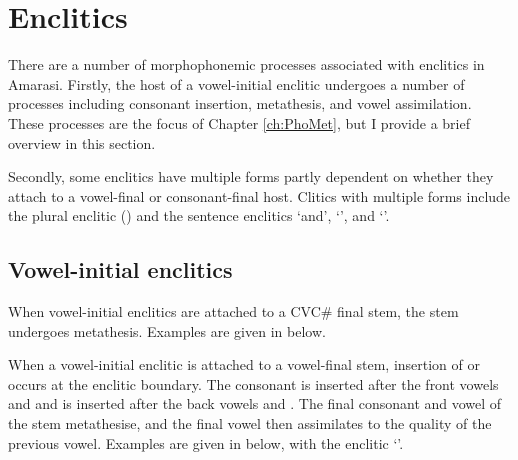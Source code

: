 \section{Enclitics}\label{sec:CliBou}
There are a number of morphophonemic processes
associated with enclitics in Amarasi.
Firstly, the host of a vowel-initial enclitic
undergoes a number of processes including
consonant insertion, metathesis, and vowel assimilation.
These processes are the focus of Chapter \ref{ch:PhoMet},
but I provide a brief overview in this section.

Secondly, some enclitics have multiple forms
partly dependent on whether they attach to a vowel-final
or consonant-final host. Clitics with multiple forms
include the plural enclitic  ()
and the sentence enclitics  `and', 
`', and  `'.

\subsection{Vowel-initial enclitics}\label{sec:VowIniEnc}
When vowel-initial enclitics are attached to a CVC{\#} final stem,
the stem undergoes metathesis. Examples are given in  below.

\begin{exe}
	\label{ex:CVC=V->VCC=V}
\end{exe}

When a vowel-initial enclitic is attached to a vowel-final stem,
insertion of \ve{\j} or  occurs at the enclitic boundary.
The consonant \ve{\j} is inserted after the front vowels  and  
and  is inserted after the back vowels  and .
The final consonant and vowel of the stem metathesise,
and the final vowel then assimilates to the quality of the previous vowel.
Examples are given in  below,
with the enclitic  `{\ee}'.

